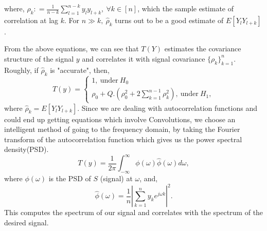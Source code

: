\documentclass[a4paper,english,12pt]{article}
\begin{document}
where, $\hat{\rho}_k\colon=\frac{1}{n-k}\sum\limits_{l=1}^{n-k}y_ly_{l+k},~\forall k \in [n]$, which the sample estimate of correlation at lag $k$. For $n\gg k,~\hat{\rho}_k$ turns out to be a good estimate of $E[Y_l Y_{l+k}]$.
\par From the above equations, we can see that $T(Y)$ estimates the covariance structure of the signal $y$ and correlates it with signal covariance $\{\rho_k\}_{k=1}^{n}$. Roughly, if $\hat{\rho}_k$ is "accurate", then,
\begin{equation*}
T(y)=
\begin{cases}
 1 ,~\mbox{under}~H_0\\
 \rho_0+Q.\left(\rho_0^2+2\sum\limits_{k=1}^{n-1}\rho_k^2\right),~\mbox{under}~H_1,
\end{cases}
\end{equation*}
where $\hat{\rho}_k= E[Y_l Y_{l+k}]$. Since we are dealing with autocorrelation functions and could end up getting equations which involve Convolutions, we choose an intelligent method of going to the frequency domain, by taking the Fourier transform of the autocorrelation function which gives us the power spectral density(PSD).
\begin{equation*}
T(y)=\frac{1}{2\pi}\int_{-\infty}^{\infty}\phi(\omega)\hat{\phi}(\omega)d\omega,
\end{equation*}
where $\phi(\omega)$  is the PSD of $S$ (signal) at $\omega$, and,
\begin{equation*} 
\hat{\phi}(\omega)=\frac{1}{n}\left|\sum\limits_{k=1}^{n}y_ke^{j\omega k}\right|^2.
\end{equation*}
This computes the spectrum of our signal and correlates with the spectrum of the desired signal.
\end{document}
